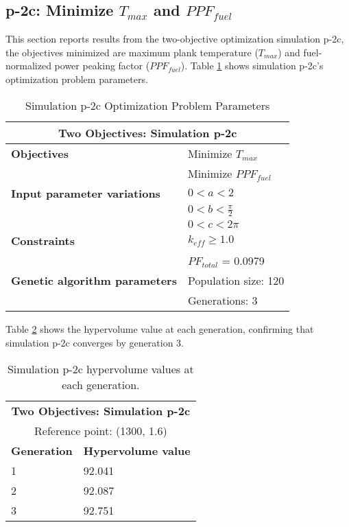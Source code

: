 \subsection{p-2c: Minimize $T_{max}$ and $PPF_{fuel}$}
\label{sec:p-2c}
This section reports results from the two-objective optimization simulation p-2c, the 
objectives minimized are maximum plank temperature ($T_{max}$) and fuel-normalized 
power peaking factor ($PPF_{fuel}$).  
Table \ref{tab:simulationp2c} shows simulation p-2c's optimization problem parameters. 
\begin{table}[htbp!]
    \centering
    \onehalfspacing
    \caption{Simulation p-2c Optimization Problem Parameters}
	\label{tab:simulationp2c}
    \footnotesize
    \begin{tabular}{l|p{3cm}}
    \hline 
    \multicolumn{2}{c}{\textbf{Two Objectives: Simulation p-2c}} \\
    \hline 
    \textbf{Objectives} & Minimize $T_{max}$ \\
    & Minimize $PPF_{fuel}$ \\
    \hline 
    \textbf{Input parameter variations} & $0<a<2$ \\
    & $0<b<\frac{\pi}{2}$ \\
    & $0<c<2\pi$ \\
    \hline
    \textbf{Constraints} & $k_{eff} \geq 1.0$\\ 
    & $PF_{total}$ = 0.0979\\
    \hline 
    \textbf{Genetic algorithm parameters} & Population size: 120 \\
    & Generations: 3 \\
    \hline
    \end{tabular}
\end{table}

Table \ref{tab:p2c-hypervolume} shows the hypervolume value at each generation, 
confirming that simulation p-2c converges by generation 3. 
\begin{table}[htbp!]
    \centering
    \onehalfspacing
    \caption{Simulation p-2c hypervolume values at each generation.}
	\label{tab:p2c-hypervolume}
    \footnotesize
    \begin{tabular}{ll}
    \hline 
    \multicolumn{2}{c}{\textbf{Two Objectives: Simulation p-2c}} \\
    \multicolumn{2}{c}{Reference point: (1300, 1.6)} \\
    \hline 
    \textbf{Generation} & \textbf{Hypervolume value} \\
    \hline
    1 & 92.041 \\
    2 & 92.087\\
    3 & 92.751 \\
    \hline
    \end{tabular}
\end{table}

